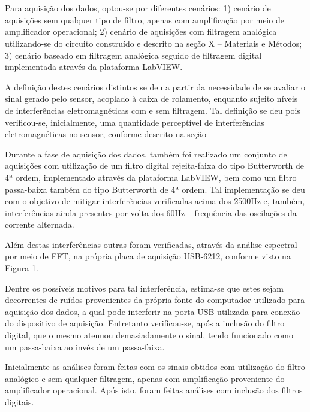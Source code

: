 \documentclass[
	12pt,				
	oneside,			
	a4paper,			
	english,			
	brazil,			
	]{abntex2ppgsi}
\begin{document}
\section{}

Para aquisição dos dados, optou-se por diferentes cenários: 1) cenário de aquisições sem qualquer tipo de filtro, apenas com amplificação por meio de amplificador operacional; 2) cenário de aquisições com filtragem analógica utilizando-se do circuito construído e descrito na seção X – Materiais e Métodos; 3) cenário baseado em filtragem analógica seguido de filtragem digital implementada através da plataforma LabVIEW.

A definição destes cenários distintos se deu a partir da necessidade de se avaliar o sinal gerado pelo sensor, acoplado à caixa de rolamento, enquanto sujeito níveis de interferências eletromagnéticas com e sem filtragem. Tal definição se deu pois verificou-se, inicialmente, uma quantidade perceptível de interferências eletromagnéticas no sensor, conforme descrito na seção ~

Durante a fase de aquisição dos dados, também foi realizado um conjunto de aquisições com utilização de um filtro digital rejeita-faixa do tipo Butterworth de 4ª ordem, implementado através da plataforma LabVIEW, bem como um filtro passa-baixa também do tipo Butterworth de 4ª ordem. Tal implementação se deu com o objetivo de mitigar interferências verificadas acima dos 2500Hz e, também, interferências ainda presentes por volta dos 60Hz – frequência das oscilações da corrente alternada. 

Além destas interferências outras foram verificadas, através da análise espectral por meio de FFT, na própria placa de aquisição USB-6212, conforme visto na Figura 1.

Dentre os possíveis motivos para tal interferência, estima-se que estes sejam decorrentes de ruídos provenientes da própria fonte do computador utilizado para aquisição dos dados, a qual pode interferir na porta USB utilizada para conexão do dispositivo de aquisição. Entretanto verificou-se, após a inclusão do filtro digital, que o mesmo atenuou demasiadamente o sinal, tendo funcionado como um passa-baixa ao invés de um passa-faixa. 

Inicialmente as análises foram feitas com os sinais obtidos com utilização do filtro analógico e sem qualquer filtragem, apenas com amplificação proveniente do amplificador operacional. Após isto, foram feitas análises com inclusão dos filtros digitais. 
\end{document}
